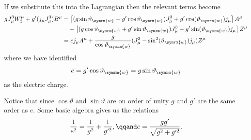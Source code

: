 \documentclass[fleqn]{NotesClass}
\newcommand{\weinbergangle}{\vartheta_{\symrm{w}}}
\begin{document}
    If we substitute this into the Lagrangian then the relevant terms become
    \begin{align}
        gJ^3_\mu W_3^\mu + g'(j_\mu J_\mu^3)B^\mu &= \left[ (g\sin\weinbergangle - g'\cos\weinbergangle) J^3_\mu + g'\cos(\weinbergangle) j_\mu \right]A^\mu \notag\\
        &\quad + \left[ (g\cos\weinbergangle + g'\sin\weinbergangle)J^3_\mu - g'\sin(\weinbergangle) j_\mu \right]Z^\mu \notag\\
        &= ej_\mu A^\mu + \frac{g}{\cos\weinbergangle} (J^3_\mu - \sin^2(\weinbergangle)j_\mu)Z^\mu
    \end{align}
    where we have identified
    \begin{equation}
        e = g'\cos\weinbergangle = g\sin\weinbergangle
    \end{equation}
    as the electric charge.
    
    Notice that since \(\cos\vartheta\) and \(\sin\vartheta\) are on order of unity \(g\) and \(g'\) are the same order as \(e\).
    Some basic algebra gives us the relations
    \begin{equation}
        \frac{1}{e^2} = \frac{1}{g^2} + \frac{1}{g'^2}, \qqand e = \frac{gg'}{\sqrt{g^2 + g'^2}}.
    \end{equation}
    
\end{document}
